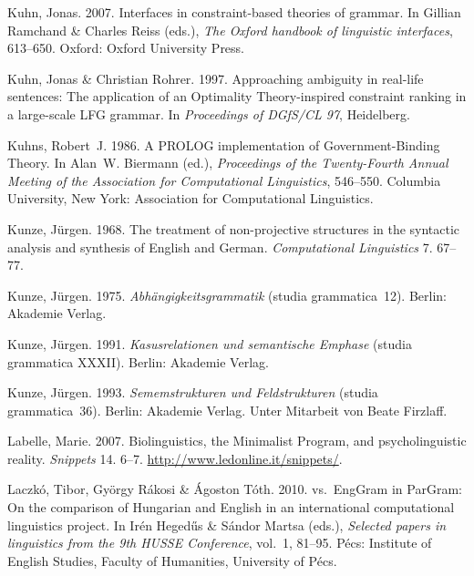 \begin{thebibliography}{1420}
Kuhn, Jonas. 2007.
\newblock Interfaces in constraint-based theories of grammar.
\newblock In Gillian Ramchand \& Charles Reiss (eds.), \emph{The {Oxford}
  handbook of linguistic interfaces}, 613--650. Oxford: Oxford University
  Press.

Kuhn, Jonas \& Christian Rohrer. 1997.
\newblock Approaching ambiguity in real-life sentences: {The} application of an
  {Optimality Theory}-inspired constraint ranking in a large-scale {LFG}
  grammar.
\newblock In \emph{Proceedings of {DGfS/CL} 97}, Heidelberg.

Kuhns, Robert~J. 1986.
\newblock A {PROLOG} implementation of {Government-Binding Theory}.
\newblock In Alan~W. Biermann (ed.), \emph{Proceedings of the {Twenty-Fourth
  Annual Meeting of the Association for Computational Linguistics}}, 546--550.
  Columbia University, New York: Association for Computational Linguistics.

Kunze, J{\"u}rgen. 1968.
\newblock The treatment of non-projective structures in the syntactic analysis
  and synthesis of {English} and {German}.
\newblock \emph{Computational Linguistics} 7. 67--77.

Kunze, J{\"u}rgen. 1975.
\newblock \emph{Abh{\"a}ngigkeitsgrammatik} (studia grammatica~12).
\newblock Berlin: Akademie Verlag.

Kunze, J{\"u}rgen. 1991.
\newblock \emph{{Kasusrelationen und semantische Emphase}}  (studia grammatica
  {XXXII}).
\newblock Berlin: Akademie Verlag.

Kunze, J{\"u}rgen. 1993.
\newblock \emph{{Sememstrukturen und Feldstrukturen}} (studia grammatica~36).
\newblock Berlin: Akademie Verlag.
\newblock Unter Mitarbeit von Beate Firzlaff.

Labelle, Marie. 2007.
\newblock Biolinguistics, the {Minimalist Program}, and psycholinguistic
  reality.
\newblock \emph{Snippets} 14. 6--7.
\newblock \urlprefix\url{http://www.ledonline.it/snippets/}.

Laczk{\'o}, Tibor, Gy{\"o}rgy R{\'a}kosi \& {\'A}goston T{\'o}th. 2010.
 vs.\ {EngGram} in {ParGram}: {On} the comparison of
  {Hungarian} and {English} in an international computational linguistics
  project.
\newblock In Ir{\'e}n Heged{\H u}s \& S{\'a}ndor Martsa (eds.), \emph{Selected
  papers in linguistics from the {9th HUSSE Conference}}, vol.~1, 81--95.
  P{\'e}cs: Institute of English Studies, Faculty of Humanities, University of
  P{\'e}cs.


\end{thebibliography}
